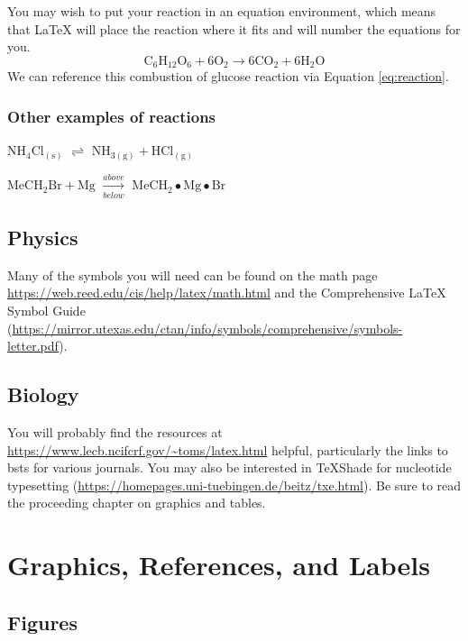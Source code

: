 \documentclass[12pt,twoside]{reedthesis}
\begin{document}
You may wish to put your reaction in an equation environment, which means that LaTeX will place the reaction where it fits and will number the equations for you.
\begin{equation}
  \mathrm{C_6H_{12}O_6  + 6O_2} \longrightarrow \mathrm{6CO_2 + 6H_2O}
  \label{eq:reaction}
\end{equation}
We can reference this combustion of glucose reaction via Equation \eqref{eq:reaction}.

\hypertarget{other-examples-of-reactions}{%
\subsection{Other examples of reactions}\label{other-examples-of-reactions}}

\(\mathrm{NH_4Cl_{(s)}}\) \(\rightleftharpoons\) \(\mathrm{NH_{3(g)}+HCl_{(g)}}\)

\noindent \(\mathrm{MeCH_2Br + Mg}\) \(\xrightarrow[below]{above}\) \(\mathrm{MeCH_2\bullet Mg \bullet Br}\)

\hypertarget{physics}{%
\section{Physics}\label{physics}}

Many of the symbols you will need can be found on the math page \url{https://web.reed.edu/cis/help/latex/math.html} and the Comprehensive LaTeX Symbol Guide (\url{https://mirror.utexas.edu/ctan/info/symbols/comprehensive/symbols-letter.pdf}).

\hypertarget{biology}{%
\section{Biology}\label{biology}}

You will probably find the resources at \url{https://www.lecb.ncifcrf.gov/~toms/latex.html} helpful, particularly the links to bsts for various journals. You may also be interested in TeXShade for nucleotide typesetting (\url{https://homepages.uni-tuebingen.de/beitz/txe.html}). Be sure to read the proceeding chapter on graphics and tables.

\hypertarget{ref-labels}{%
\chapter{Graphics, References, and Labels}\label{ref-labels}}

\hypertarget{figures}{%
\section{Figures}\label{figures}}
\end{document}
